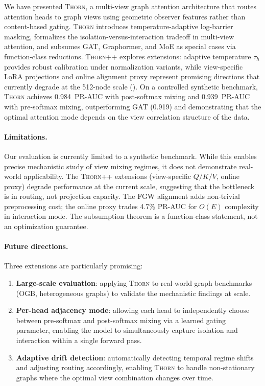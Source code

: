 \documentclass[11pt,a4paper]{article}
\newcommand{\thorn}{\textsc{Thorn}}
\newcommand{\thornpp}{\textsc{Thorn++}}
\begin{document}
We have presented \thorn{}, a multi-view graph attention architecture
that routes attention heads to graph views using geometric observer
features rather than content-based gating.
\thorn{} introduces temperature-adaptive log-barrier masking, formalizes
the isolation-versus-interaction tradeoff in multi-view attention, and
subsumes GAT, Graphormer, and MoE as special cases via function-class
reductions.
\thornpp{} explores extensions: adaptive temperature $\tau_h$ provides
robust calibration under normalization variants, while view-specific
LoRA projections and online alignment proxy represent promising
directions that currently degrade at the 512-node scale
().
On a controlled synthetic benchmark, \thorn{} achieves 0.984~PR-AUC
with post-softmax mixing and 0.939~PR-AUC with pre-softmax mixing,
outperforming GAT (0.919) and demonstrating that the optimal attention
mode depends on the view correlation structure of the data.

\paragraph{Limitations.}
Our evaluation is currently limited to a synthetic benchmark.
While this enables precise mechanistic study of view mixing regimes,
it does not demonstrate real-world applicability.
The \thornpp{} extensions (view-specific $Q/K/V$, online proxy) degrade
performance at the current scale, suggesting that the bottleneck
is in routing, not projection capacity.
The FGW alignment adds non-trivial preprocessing cost; the online
proxy trades 4.7\% PR-AUC for $O(E)$ complexity in interaction mode.
The subsumption theorem is a function-class statement, not an
optimization guarantee.

\paragraph{Future directions.}
Three extensions are particularly promising:
\begin{enumerate}[nosep]
  \item \textbf{Large-scale evaluation}: applying \thorn{} to
    real-world graph benchmarks (OGB, heterogeneous graphs) to validate
    the mechanistic findings at scale.
  \item \textbf{Per-head adjacency mode}: allowing each head to
    independently choose between pre-softmax and post-softmax mixing via
    a learned gating parameter, enabling the model to simultaneously
    capture isolation and interaction within a single forward pass.
  \item \textbf{Adaptive drift detection}: automatically detecting
    temporal regime shifts and adjusting routing accordingly, enabling
    \thorn{} to handle non-stationary graphs where the optimal view
    combination changes over time.
\end{enumerate}



\end{document}
